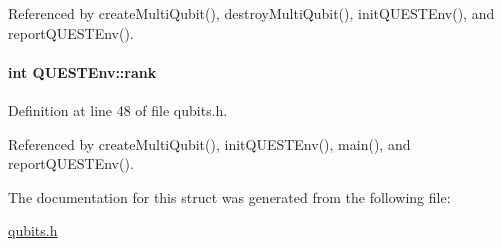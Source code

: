 Referenced by create\+Multi\+Qubit(), destroy\+Multi\+Qubit(), init\+Q\+U\+E\+S\+T\+Env(), and report\+Q\+U\+E\+S\+T\+Env().

\paragraph[{\texorpdfstring{rank}{rank}}]{\setlength{\rightskip}{0pt plus 5cm}int Q\+U\+E\+S\+T\+Env\+::rank}\hypertarget{structQUESTEnv_a1bdb6d425a2ce6a468f93929c0b26d73}{}\label{structQUESTEnv_a1bdb6d425a2ce6a468f93929c0b26d73}


Definition at line 48 of file qubits.\+h.



Referenced by create\+Multi\+Qubit(), init\+Q\+U\+E\+S\+T\+Env(), main(), and report\+Q\+U\+E\+S\+T\+Env().



The documentation for this struct was generated from the following file\+:\begin{DoxyCompactItemize}
\item 
\hyperlink{qubits_8h}{qubits.\+h}\end{DoxyCompactItemize}
